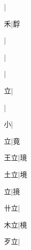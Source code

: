 \begin{multicols}{2}
{{\cjk{}{\cnsym{}　}{\cnsym{}　}{\cnsym{}　}}|{}\par
{\cjk{}{\cnsym{}　}{\cnsym{}　}禾}|{\cjk{}馟}\par
{}|{}\par
{\cjk{}{\cnsym{}　}{\cnsym{}　}{\cnsym{}　}}|{}\par
{\cjk{}{\cnsym{}　}{\cnsym{}　}{\cnsym{}　}}|{}\par
{\cjk{}{\cnsym{}　}{\cnsym{}　}立}|{}\par
{\cjk{}{\cnsym{}　}{\cnsym{}　}{\cnsym{}　}}|{}\par
{\cjk{}{\cnsym{}　}{\cnsym{}　}小}|{}\par
{\cjk{}{\cnsym{}　}{\cnsym{}　}立}|{\cjk{}竟}\par
{\cjk{}{\cnsym{}　}王立}|{\cjk{}璄}\par
{\cjk{}{\cnsym{}　}土立}|{\cjk{}境}\par
{立}|{\cjk{}摬}\par
{\cjk{}{\cnsym{}　}卄立}|{}\par
{\cjk{}{\cnsym{}　}木立}|{\cjk{}樈}\par
{\cjk{}{\cnsym{}　}歹立}|{}\par
}
\end{multicols}
